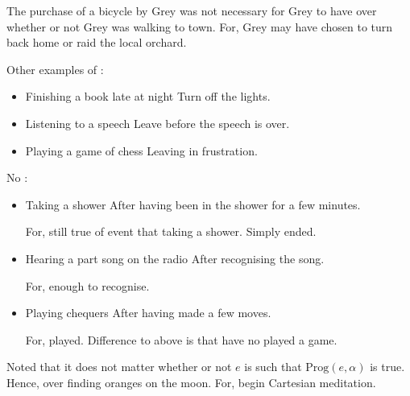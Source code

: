\begin{note}
  The purchase of a bicycle by Grey was not necessary for Grey to have \ninf{} over whether or not Grey was walking to town.
  For, Grey may have chosen to turn back home or raid the local orchard.

  Other examples of :

  \begin{itemize}[noitemsep]
  \item
    Finishing a book late at night \hfill Turn off the lights.
  \item
    Listening to a speech \hfill Leave before the speech is over.
  \item
    Playing a game of chess \hfill Leaving in frustration.
  \end{itemize}

  No \ninf{}:

  \begin{itemize}
  \item
    Taking a shower \hfill After having been in the shower for a few minutes.

    For, still true of event that taking a shower.
    Simply ended.
  \item
    Hearing a part song on the radio \hfill After recognising the song.

    For, enough to recognise.
  \item
    Playing chequers \hfill After having made a few moves.

    For, played.
    Difference to above is that have no played a game.
  \end{itemize}

  Noted that it does not matter whether or not \(e\) is such that \(\text{Prog}(e, \alpha)\) is true.
  Hence, \ninf{} over finding oranges on the moon.
  For, begin Cartesian meditation.
\end{note}

